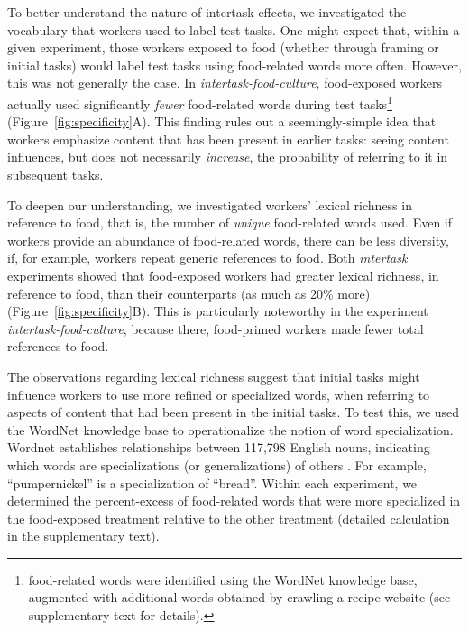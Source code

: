 \documentclass{sigchi}
\begin{document}
To better understand the nature of 
intertask effects, we investigated the vocabulary
that workers used to label test tasks. One might expect that, within a given 
experiment, those workers exposed to food (whether through framing or initial
tasks) would label test tasks using 
food-related words more often.  However, this was not generally 
the case. In \textit{intertask-food-culture}, food-exposed
workers actually used significantly \textit{fewer} food-related words 
during test tasks\footnote{
	food-related words were identified using the WordNet knowledge base, 
	augmented with additional words obtained by crawling a recipe website 
	(see supplementary text for details).
} (Figure~\ref{fig:specificity}A).  This finding
rules out a seemingly-simple idea that workers emphasize
content that has been present in earlier tasks: seeing content 
influences, but does not necessarily \textit{increase}, the probability of 
referring to it in subsequent tasks.

To deepen our understanding, we investigated workers' lexical richness in 
reference to food, that is, the number of \textit{unique} food-related words
used.  Even if workers provide an abundance of food-related words, there
can be less diversity, if, for example, workers repeat generic references 
to food.
Both \textit{intertask} experiments showed that food-exposed workers had 
greater lexical richness, in reference to food, than their counterparts 
(as much as 20\% more) (Figure~\ref{fig:specificity}B).  
This is particularly noteworthy in the experiment
\textit{intertask-food-culture}, because there,
food-primed workers made fewer total references to food.  

The observations regarding lexical richness suggest that 
initial tasks might influence workers to use more refined or specialized 
words, when referring to aspects of content that had been present in the 
initial tasks.  
To test this, we used the WordNet knowledge base to operationalize the 
notion of word specialization.  Wordnet establishes relationships between
117,798 English nouns, indicating which words are specializations
(or generalizations) of others \cite{felbaum1998wordnet}. 
For example, ``pumpernickel'' is a specialization of ``bread''.
Within each experiment, we determined the percent-excess of food-related
words that were more specialized in the food-exposed treatment relative
to the other treatment (detailed calculation in the supplementary text). 
\end{document}
